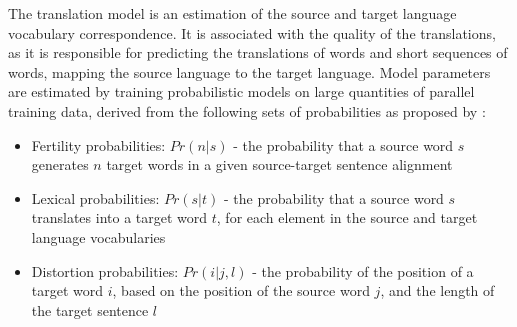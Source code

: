 


The translation model is an estimation of the source and target language vocabulary correspondence. It is associated with the quality of the translations, as it is responsible for predicting the translations of words and short sequences of words, mapping the source language to the target language. Model parameters are estimated by training probabilistic models on large quantities of parallel training data, derived from the following sets of probabilities as proposed by \cite{brown_statistical_1990}:
\begin{itemize}
    \item Fertility probabilities:  $Pr(n|s)$ - the probability that a source word $s$ generates $n$ target words in a given source-target sentence alignment
    
    \item Lexical probabilities: $Pr(s|t)$ - the probability that a source word $s$ translates into a target word $t$, for each element in the source and target language vocabularies
    
    \item Distortion probabilities: $Pr(i|j, l)$ - the probability of the position of a target word $i$, based on the position of the source word $j$, and the length of the target sentence $l$
    
    
\end{itemize}


